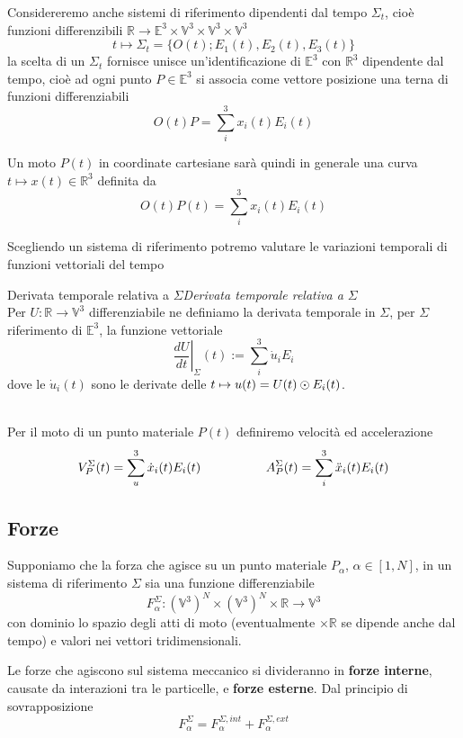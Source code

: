 \documentclass[11pt,a4paper,twoside]{book}
\newenvironment{definizione}[1][\empty]{\begin{Definizione}{
\ifx\empty#1\relax\else\mdseries\itshape#1\\\fi
}{}}{\end{Definizione}}
\theoremstyle{esss}
\theoremstyle{dotless}
\numberwithin{equation}{section} %
\begin{document}
Considereremo anche sistemi di riferimento dipendenti dal tempo $\Sigma_t$, cioè funzioni differenzibili $\mathbb{R}\rightarrow\mathbb{E}^3\times\mathbb{V}^3\times\mathbb{V}^3\times\mathbb{V}^3$ 
\[t\mapsto \Sigma_t=\{ O(t); E_1(t),E_2(t),E_3(t) \}
\]
la scelta di un $\Sigma_t$ fornisce unisce un'identificazione di $\mathbb{E}^3$ con $\mathbb{R}^3$ dipendente dal tempo, cioè ad ogni punto $P\in\mathbb{E}^3$ si associa come vettore posizione una terna di funzioni differenziabili
\[
O(t)P=\sum_i^3 x_i(t)E_i(t)
\]

Un moto $P(t)$ in coordinate cartesiane sarà quindi in generale una curva $t\mapsto x(t)\in\mathbb{R}^3$ definita da
\begin{equation}
O(t)P(t)=\sum_i^3 x_i(t) E_i(t)
\end{equation}

Scegliendo un sistema di riferimento potremo valutare le variazioni temporali di funzioni vettoriali del tempo
\begin{definizione}[Derivata temporale relativa a $\Sigma$]
Per $U:\mathbb{R}\rightarrow\mathbb{V}^3$ differenziabile ne definiamo la derivata temporale in $\Sigma$, per $\Sigma$ riferimento di $\mathbb{E}^3$, la funzione vettoriale
\[
\left. \dfrac{dU}{dt} \right|_{\Sigma}(t) := \sum_i^3 \dot{u}_i E_i
\]
dove le $\dot{u}_i(t)$ sono le derivate delle $t\mapsto u(t)=U(t)\odot E_i(t)$.
\end{definizione}

\begin{definizione}
Per il moto di un punto materiale $P(t)$ definiremo velocità ed accelerazione 
\[
V_P^\Sigma(t)=\sum_u^3 \dot{x}_i(t)E_i(t) \hspace{0.15\linewidth} A_P^\Sigma(t)=\sum_i^3 \ddot{x}_i(t)E_i(t)
\]
\end{definizione}

\subsection{Forze}

Supponiamo che la forza che agisce su un punto materiale $P_\alpha$, $\alpha\in[1,N]$, in un sistema di riferimento $\Sigma$ sia una funzione differenziabile
\[
F_\alpha^\Sigma : \left(\mathbb{V}^{3}\right)^N \times \left(\mathbb{V}^{3}\right)^N \times \mathbb{R} \rightarrow \mathbb{V}^3
\]
con dominio lo spazio degli atti di moto (eventualmente $\times\mathbb{R}$ se dipende anche dal tempo) e valori nei vettori tridimensionali.

Le forze che agiscono sul sistema meccanico si divideranno in \textbf{forze interne}, causate da interazioni tra le particelle, e \textbf{forze esterne}.
Dal principio di sovrapposizione
\[
F_\alpha^\Sigma=F_\alpha^{\Sigma,int}+F_\alpha^{\Sigma,ext}
\]
\end{document}

